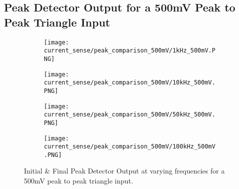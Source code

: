 \subsection*{Peak Detector Output for a 500mV Peak to Peak Triangle Input}
\begin{figure}[H]
    
    \centering
    \begin{subfigure}{0.45\textwidth}
        \texttt{[image: current\_sense/peak\_comparison\_500mV/1kHz\_500mV.PNG]}
    \end{subfigure}
    \begin{subfigure}{0.45\textwidth}
        \texttt{[image: current\_sense/peak\_comparison\_500mV/10kHz\_500mV.PNG]}
    \end{subfigure}
    \begin{subfigure}{0.45\textwidth}
        \texttt{[image: current\_sense/peak\_comparison\_500mV/50kHz\_500mV.PNG]}
    \end{subfigure}
    \begin{subfigure}{0.45\textwidth}
        \texttt{[image: current\_sense/peak\_comparison\_500mV/100kHz\_500mV.PNG]}
    \end{subfigure}
    \caption{Initial \& Final Peak Detector Output at varying frequencies for a 500mV peak to peak triangle input.}
\end{figure}

